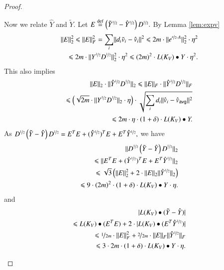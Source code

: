 \documentclass[twoside,leqno,twocolumn]{article}
\newcommand{\nfrac}{\nicefrac}
\renewcommand{\leq}{\leqslant}
\newcommand{\abs}[1]{\lvert#1\rvert}
\newcommand{\norm}[1]{\lVert#1\rVert}
\newcommand{\defeq}{\stackrel{\textup{def}}{=}}
\newcommand{\normt}[1]{\norm{#1}_{\scriptstyle 2}}
\newcommand{\e}{\epsilon}
\let\e\varepsilon
\newcommand{\Deg}{D^{\nfrac{1}{2}}}
\numberwithin{equation}{section}
\newcommand{\avg}{{\ensuremath{\mathsf{avg}}\xspace}}
\begin{document}
\begin{proof}
\begin{itemize}
Now we relate $\hat{Y}$ and $\tilde{Y}$. Let $E \defeq \left(\tilde{Y}^{\nfrac{1}{2}} - \hat{Y}^{\nfrac{1}{2}}\right) \Deg.$ 
By Lemma \ref{lem:expv} 
\begin{align*}
\normt{E}^2 \leq \norm{E}^2_F = \sum_{i} \norm{d_i \tilde{v}_i - \hat{v}_i}^2  \leq 2m \cdot \normt{e^{\nfrac{\e}{2}\cdot  A}}^2 \cdot  \eta^2 \\
\leq 2m \cdot \normt{Y^{\nfrac{1}{2}}\Deg}^2 \cdot \eta^2 \leq  (2m)^2 \cdot L(K_V) \bullet Y \cdot \eta^2.
\end{align*}
This also implies
\begin{align*}
\normt{E} \cdot \normt{\hat{Y}^{\nfrac{1}{2}}\Deg} \leq \norm{E}_F \cdot \norm{\hat{Y}^{\nfrac{1}{2}}\Deg}_F 
\\
\leq \left(\sqrt{2m} \cdot \normt{Y^{\nfrac{1}{2}}\Deg} \cdot \eta \right) \cdot \sqrt{\sum_{i} d_i \norm{\hat{v}_i -\hat{v}_\avg}^2 } 
\\
\leq 2m \cdot \eta \cdot (1+\delta) \cdot L(K_V) \bullet Y.
\end{align*}
As $\Deg\left(\tilde{Y} - \hat{Y}\right)\Deg = E^T E + (\hat{Y}^{\nfrac{1}{2}})^T E + E^T \hat{Y}^{\nfrac{1}{2}},$ we have
\begin{align*}
\normt{\Deg\left(\tilde{Y} - \hat{Y}\right)\Deg} 
\\
\leq \normt{E^T E + (\hat{Y}^{\nfrac{1}{2}})^T E + E^T \hat{Y}^{\nfrac{1}{2}}} 
\\
\leq \sqrt{3} \left(\normt{E}^2 + 2 \cdot \normt{E} \normt{\hat{Y}^{\nfrac{1}{2}}}\right) \\
\leq 
9 \cdot (2m)^2 \cdot (1+\delta) \cdot L(K_V) \bullet Y \cdot \eta.
\end{align*}
and
\begin{align*}
\abs{L(K_V) \bullet (\tilde{Y} - \hat{Y})} \\
\leq  L(K_V) \bullet (E^T E) + 2 \cdot \abs{L(K_V) \bullet (E^T \hat{Y}^{\nfrac{1}{2}})}
\\
 \leq \nfrac{1}{2m} \cdot \norm{E}^2_F + \nfrac{2}{2m} \cdot \norm{E}_F \norm{\hat{Y}^{\nfrac{1}{2}}}_F 
\\
\leq 3 \cdot 2m \cdot (1+\delta) \cdot L(K_V) \bullet Y \cdot \eta.
\end{align*}


\end{itemize}
\end{proof}
\end{document}
